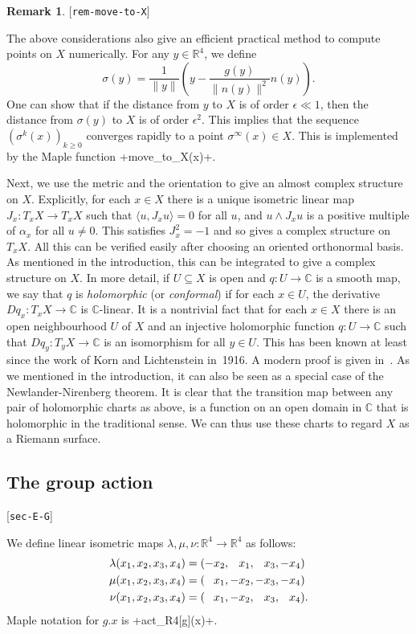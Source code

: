 \documentclass[reqno]{amsart}
\newcommand{\lbl}[1]{\label{#1}\textup{[\texttt{#1}]}\par}
\newcommand{\lbl}{\label}
\newcommand{\al}        {\alpha}
\newcommand{\ep}        {\epsilon}
\newcommand{\lm}        {\lambda}
\newcommand{\sg}        {\sigma}
\newcommand{\R}         {{\mathbb{R}}}
\newcommand{\C}         {{\mathbb{C}}}
\newcommand{\ip}[1]     {\langle #1\rangle}
\newcommand{\sse}       {\subseteq}
\newcommand{\pp}        {\hphantom{+}}
\renewcommand{\:}{\colon}
\theoremstyle{definition}
\newtheorem{remark}[theorem]{Remark}
\begin{document}
\begin{remark}\lbl{rem-move-to-X}
 The above considerations also give an efficient practical method to
 compute points on $X$ numerically.  For any $y\in\R^4$, we define
 \[ \sg(y) =
     \frac{1}{\|y\|}\left(y - \frac{g(y)}{\|n(y)\|^2}n(y)\right).
 \]
 One can show that if the distance from $y$ to $X$ is of order
 $\ep\ll 1$, then the distance from $\sg(y)$ to $X$ is of order
 $\ep^2$.  This implies that the sequence $(\sg^k(x))_{k\geq 0}$
 converges rapidly to a point $\sg^\infty(x)\in X$.  This is
 implemented by the Maple function \mcode+move_to_X(x)+.
\end{remark}

Next, we use the metric and the orientation to give an almost complex
structure on $X$.  Explicitly, for each $x\in X$ there is a unique
isometric linear map $J_x\:T_xX\to T_xX$ such that $\ip{u,J_xu}=0$ for
all $u$, and $u\wedge J_xu$ is a positive multiple of $\al_x$ for all
$u\neq 0$.  This satisfies $J_x^2=-1$ and so gives a complex structure
on $T_xX$.  All this can be verified easily after choosing an oriented
orthonormal basis.  As mentioned in the introduction, this can be
integrated to give a complex structure on $X$.  In more detail, if
$U\sse X$ is open and $q\:U\to\C$ is a smooth map, we say that $q$ is
\emph{holomorphic} (or \emph{conformal}) if for each $x\in U$, the
derivative $Dq_x\:T_xX\to\C$ is $\C$-linear.  It is a nontrivial fact
that for each $x\in X$ there is an open neighbourhood $U$ of $X$ and
an injective holomorphic function $q\:U\to\C$ such that
$Dq_y\:T_yX\to\C$ is an isomorphism for all $y\in U$.  This has been
known at least since the work of Korn and Lichtenstein in~1916.  A
modern proof is given in~\cite{deka:srt}.  As we mentioned in the
introduction, it can also be seen as a special case of the
Newlander-Nirenberg theorem.  It is clear that the transition map
between any pair of holomorphic charts as above, is a function on an
open domain in $\C$ that is holomorphic in the traditional sense.  We
can thus use these charts to regard $X$ as a Riemann surface.

\subsection{The group action}
\lbl{sec-E-G}

We define linear isometric maps $\lm,\mu,\nu:\R^4\to\R^4$ as follows:
\begin{align*}
 \lm(x_1,x_2,x_3,x_4) &= (   -x_2,\pp x_1,\pp x_3,   -x_4) \\
 \mu(x_1,x_2,x_3,x_4) &= (\pp x_1,   -x_2,   -x_3,   -x_4) \\
 \nu(x_1,x_2,x_3,x_4) &= (\pp x_1,   -x_2,\pp x_3,\pp x_4).
\end{align*}
Maple notation for $g.x$ is \mcode+act_R4[g](x)+.
\end{document}
